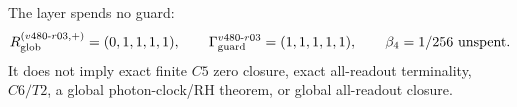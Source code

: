 The layer spends no guard:
\[
R_{\rm glob}^{(v480\text{-}r03,+)}=(0,1,1,1,1),
\qquad
\Gamma_{\rm guard}^{v480\text{-}r03}=(1,1,1,1,1),
\qquad
\beta_4=1/256\ \text{unspent}.
\]
It does not imply exact finite \(C5\) zero closure, exact all-readout terminality,
\(C6/T2\), a global photon-clock/RH theorem, or global all-readout closure.
